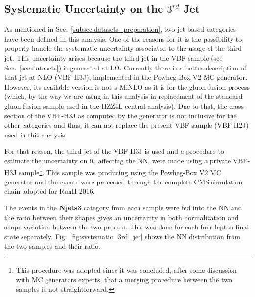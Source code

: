 
\subsection{Systematic Uncertainty on the $3^{rd}$ Jet}
As mentioned in Sec.~\ref{subsec:datasets_preparation}, two jet-based categories have been defined in this analysis. One of the reasons for it is the possibility to properly handle the systematic uncertainty associated to the usage of the third jet. This uncertainty arises because the third jet in the VBF sample (see Sec.~\ref{sec:datasets}) is generated at LO. Currently there is a better description of that jet at NLO (VBF-H3J), implemented in the Powheg-Box V2 MC generator. However, its available version is not a MiNLO as it is for the gluon-fusion process (which, by the way we are using in this analysis in replacement of the standard gluon-fusion sample used in the HZZ4L central analysis). Due to that, the cross-section of the VBF-H3J as computed by the generator is not inclusive for the other categories and thus, it can not replace the present VBF sample (VBF-H2J) used in this analysis.

For that reason, the third jet of the VBF-H3J is used and a procedure to estimate the uncertainty on it, affecting the NN, were made using a private VBF-H3J sample\footnote{This procedure was adopted since it was concluded, after some discussion with MC generators experts, that a merging procedure between the two samples is not straightforward.}. This sample was producing using the Powheg-Box V2 MC generator and the events were processed through the complete CMS simulation chain adopted for RunII 2016.

The events in the \textbf{Njets3} category from each sample were fed into the NN and the ratio between their shapes gives an uncertainty in both normalization and shape variation between the two process. This was done for each four-lepton final state separately. Fig.~\ref{fig:systematic_3rd_jet} shows the NN distribution from the two samples and their ratio.

